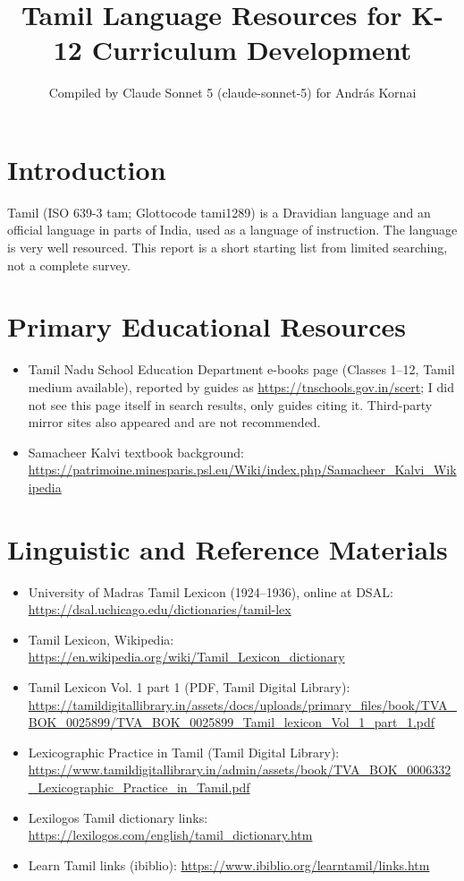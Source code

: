 \documentclass[12pt]{article}
\title{Tamil Language Resources for K-12 Curriculum Development}
\author{Compiled by Claude Sonnet 5 (claude-sonnet-5) for Andr\'as Kornai}
\date{}
\begin{document}
\maketitle
\section{Introduction}
Tamil (ISO 639-3 tam; Glottocode tami1289) is a Dravidian language and an official language in parts of India, used as a language of instruction. The language is very well resourced. This report is a short starting list from limited searching, not a complete survey.
\section{Primary Educational Resources}
\begin{itemize}
\item Tamil Nadu School Education Department e-books page (Classes 1--12, Tamil medium available), reported by guides as \url{https://tnschools.gov.in/scert}; I did not see this page itself in search results, only guides citing it. Third-party mirror sites also appeared and are not recommended.
\item Samacheer Kalvi textbook background: \url{https://patrimoine.minesparis.psl.eu/Wiki/index.php/Samacheer_Kalvi_Wikipedia}
\end{itemize}
\section{Linguistic and Reference Materials}
\begin{itemize}
\item University of Madras Tamil Lexicon (1924--1936), online at DSAL: \url{https://dsal.uchicago.edu/dictionaries/tamil-lex}
\item Tamil Lexicon, Wikipedia: \url{https://en.wikipedia.org/wiki/Tamil_Lexicon_dictionary}
\item Tamil Lexicon Vol. 1 part 1 (PDF, Tamil Digital Library): \url{https://tamildigitallibrary.in/assets/docs/uploads/primary_files/book/TVA_BOK_0025899/TVA_BOK_0025899_Tamil_lexicon_Vol_1_part_1.pdf}
\item Lexicographic Practice in Tamil (Tamil Digital Library): \url{https://www.tamildigitallibrary.in/admin/assets/book/TVA_BOK_0006332_Lexicographic_Practice_in_Tamil.pdf}
\item Lexilogos Tamil dictionary links: \url{https://lexilogos.com/english/tamil_dictionary.htm}
\item Learn Tamil links (ibiblio): \url{https://www.ibiblio.org/learntamil/links.htm}
\end{itemize}
\end{document}
